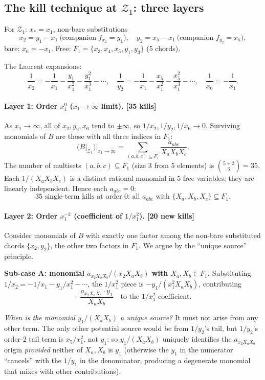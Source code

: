 \documentclass[11pt]{article}
\newcommand{\Z}{\mathcal{Z}}
\theoremstyle{definition}
\begin{document}
\subsection{The kill technique at \texorpdfstring{$\Z_1$}{Z1}: three layers}

For $\Z_1$: $x_*=x_1$, non-bare substitutions
\[
x_2=y_1-x_1\ \text{(companion $f_{x_2}=y_1$)},\quad y_2=x_5-x_1\ \text{(companion $f_{y_2}=x_5$)},
\]
bare: $x_6=-x_1$. Free: $F_1=\{x_3,x_4,x_5,y_1,y_3\}$ (5 chords).

The Laurent expansions:
\[
\frac{1}{x_2}=-\frac{1}{x_1}-\frac{y_1}{x_1^2}-\frac{y_1^2}{x_1^3}-\cdots,
\quad
\frac{1}{y_2}=-\frac{1}{x_1}-\frac{x_5}{x_1^2}-\frac{x_5^2}{x_1^3}-\cdots,
\quad
\frac{1}{x_6}=-\frac{1}{x_1}.
\]

\paragraph{Layer 1: Order $x_1^0$ ($x_1\to\infty$ limit). [\textbf{35 kills}]}

As $x_1\to\infty$, all of $x_2,y_2,x_6$ tend to $\pm\infty$, so $1/x_2,1/y_2,1/x_6\to 0$.
Surviving monomials of $B$ are those with all three indices in $F_1$:
\[
\bigl(B|_{\Z_1}\bigr)\bigr|_{x_1\to\infty} = \sum_{(a,b,c)\subseteq F_1}\frac{a_{abc}}{X_a X_b X_c}.
\]
The number of multisets $(a,b,c)\subseteq F_1$ (size 3 from 5 elements) is $\binom{5+2}{3}=35$.
Each $1/(X_aX_bX_c)$ is a distinct rational monomial in 5 free variables;
they are linearly independent. Hence each $a_{abc}=0$:
\[
\boxed{\text{35 single-term kills at order 0: all }a_{abc}\text{ with }\{X_a,X_b,X_c\}\subseteq F_1.}
\]

\paragraph{Layer 2: Order $x_1^{-2}$ (coefficient of $1/x_1^2$). [\textbf{20 new kills}]}

Consider monomials of $B$ with exactly one factor among the non-bare
substituted chords $\{x_2,y_2\}$, the other two factors in $F_1$. We argue
by the ``unique source'' principle.

\textbf{Sub-case A: monomial $a_{x_2 X_a X_b}/(x_2 X_a X_b)$ with $X_a,X_b\in F_1$.}
Substituting $1/x_2=-1/x_1-y_1/x_1^2-\cdots$, the $1/x_1^2$ piece is
$-y_1/(x_1^2 X_a X_b)$, contributing
\[
-\frac{a_{x_2 X_a X_b}\cdot y_1}{X_a X_b}\quad\text{to the $1/x_1^2$ coefficient.}
\]

\emph{When is the monomial $y_1/(X_a X_b)$ a unique source?} It must not arise
from any other term. The only other potential source would be from
$1/y_2$'s tail, but $1/y_2$'s order-2 tail term is $x_5/x_1^2$, not $y_1$;
so $y_1/(X_a X_b)$ uniquely identifies the $a_{x_2 X_a X_b}$ origin
\emph{provided} neither of $X_a, X_b$ is $y_1$ (otherwise the $y_1$ in
the numerator ``cancels'' with the $1/y_1$ in the denominator, producing
a degenerate monomial that mixes with other contributions).
\end{document}
